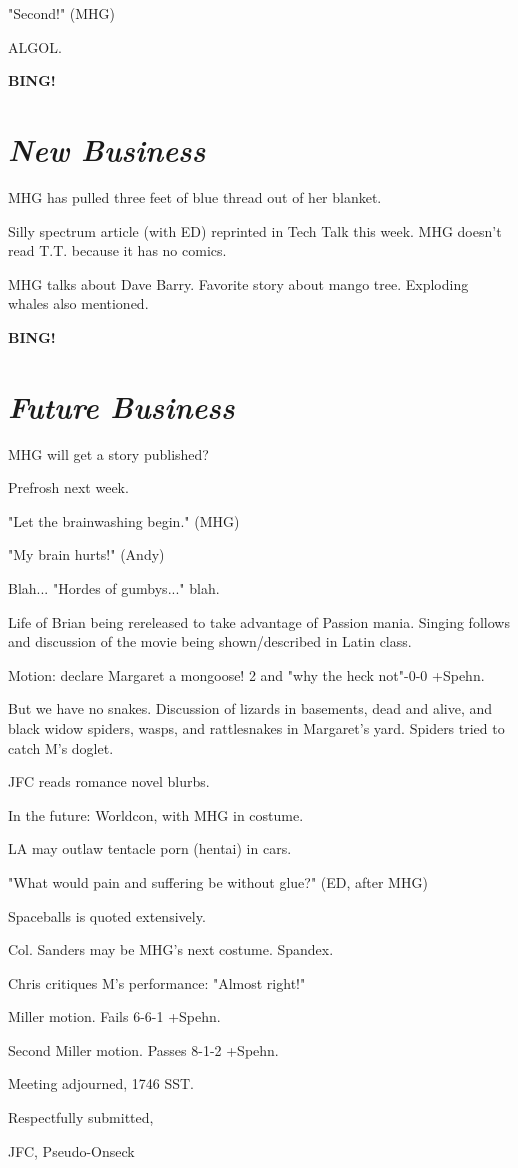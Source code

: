 \documentclass[10pt]{article}
\newcommand{\bing}{{\bf BING!} }
\newcommand{\goto}[1]{\bing \vskip 12pt \section*{{\em{#1}}}}
\begin{document}
"Second!" (MHG)

ALGOL.

\goto{New Business}

MHG has pulled three feet of blue thread out of her blanket.

Silly spectrum article (with ED) reprinted in Tech Talk this week. MHG doesn't read T.T. because it has no comics.

MHG talks about Dave Barry. Favorite story about mango tree. Exploding whales also mentioned.

\goto{Future Business}

MHG will get a story published?

Prefrosh next week.

"Let the brainwashing begin." (MHG)

"My brain hurts!" (Andy)

Blah... "Hordes of gumbys..." blah.

Life of Brian being rereleased to take advantage of Passion mania. Singing follows and discussion of the movie being shown/described in Latin class.

Motion: declare Margaret a mongoose! 2 and "why the heck not"-0-0 +Spehn.

But we have no snakes. Discussion of lizards in basements, dead and alive, and black widow spiders, wasps, and rattlesnakes in Margaret's yard. Spiders tried to catch M's doglet.

JFC reads romance novel blurbs.

In the future: Worldcon, with MHG in costume.

LA may outlaw tentacle porn (hentai) in cars.

"What would pain and suffering be without glue?" (ED, after MHG)

Spaceballs is quoted extensively.

Col. Sanders may be MHG's next costume. Spandex.

Chris critiques M's performance: "Almost right!"

Miller motion. Fails 6-6-1 +Spehn.

Second Miller motion. Passes 8-1-2 +Spehn.

\vspace{12pt}

\noindent
Meeting adjourned, 1746 SST.

\vspace{18pt}

\centerline{Respectfully submitted,}
\centerline{JFC, Pseudo-Onseck}
\end{document}
